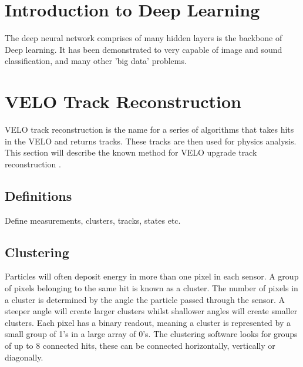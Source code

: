 
\section{Introduction to Deep Learning} %
The deep neural network comprises of many hidden layers is the backbone of Deep learning. It has been demonstrated to very capable of image and sound classification, and many other 'big data' problems.


\section{VELO Track Reconstruction} %
VELO track reconstruction is the name for a series of algorithms that takes hits in the VELO and returns tracks. These tracks are then used for physics analysis. This section will describe the known method for VELO upgrade track reconstruction \cite{Bird:1620453}.

\subsection{Definitions}
Define measurements, clusters, tracks, states etc. \cite{Hernando:1057515}

\subsection{Clustering}
Particles will often deposit energy in more than one pixel in each sensor. A group of pixels belonging to the same hit is known as a cluster. The number of pixels in a cluster is determined by the angle the particle passed through the sensor. A steeper angle will create larger clusters whilst shallower angles will create smaller clusters. Each pixel has a binary readout, meaning a cluster is represented by a small group of 1's in a large array of 0's. The clustering software looks for groups of up to 8 connected hits, these can be connected horizontally, vertically or diagonally.

